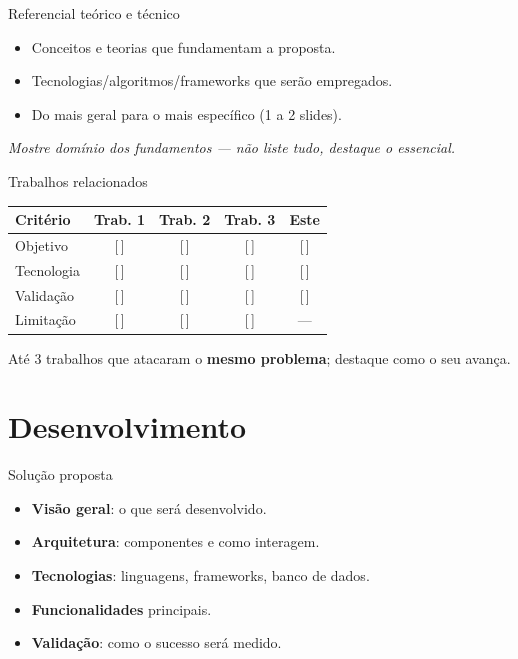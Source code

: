 \documentclass[
    aspectratio=169,   %
    12pt,
    brazil
]{beamer}
\begin{document}
\begin{frame}{Referencial teórico e técnico}
  \begin{itemize}
    \item Conceitos e teorias que fundamentam a proposta.
    \item Tecnologias/algoritmos/frameworks que serão empregados.
    \item Do mais geral para o mais específico (1 a 2 slides).
  \end{itemize}
  \vfill
  {\footnotesize\itshape Mostre domínio dos fundamentos --- não liste tudo, destaque o essencial.}
\end{frame}

\begin{frame}{Trabalhos relacionados}
  \small
  \begin{table}
    \centering
    \begin{tabular}{lcccc}
      \toprule
      \textbf{Critério} & \textbf{Trab. 1} & \textbf{Trab. 2} & \textbf{Trab. 3} & \textbf{Este} \\
      \midrule
      Objetivo   & [\,] & [\,] & [\,] & [\,] \\
      Tecnologia & [\,] & [\,] & [\,] & [\,] \\
      Validação  & [\,] & [\,] & [\,] & [\,] \\
      Limitação  & [\,] & [\,] & [\,] & --- \\
      \bottomrule
    \end{tabular}
  \end{table}
  \vfill
  {\footnotesize Até 3 trabalhos que atacaram o \textbf{mesmo problema}; destaque como o seu avança.}
\end{frame}

\section{Desenvolvimento}
\begin{frame}{Solução proposta}
  \begin{itemize}
    \item \textbf{Visão geral}: o que será desenvolvido.
    \item \textbf{Arquitetura}: componentes e como interagem.
    \item \textbf{Tecnologias}: linguagens, frameworks, banco de dados.
    \item \textbf{Funcionalidades} principais.
    \item \textbf{Validação}: como o sucesso será medido.
  \end{itemize}
\end{frame}
\end{document}
